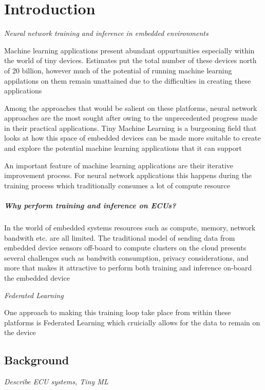 \part{Introduction}

\textit{Neural network training and inference in embedded environments}

{\color{blue}
Machine learning applications present abundant oppurtunities especially within the world of tiny devices. Estimates put the total number of these devices north of 20 billion, however much of the potential of running machine learning appilations on them remain unattained due to the difficulties in creating these applications
}

{\color{blue}
Among the approaches that would be salient on these platforms, neural network approaches are the most sought after owing to the unprecedented progress made in their practical applications. Tiny Machine Learning is a burgeoning field that looks at how this space of embedded devices can be made more suitable to create and explore the potential machine learning applications that it can support
}

{\color{blue}
An important feature of machine learning applications are their iterative improvement process. For neural network applications this happens during the training process which traditionally consumes a lot of compute resource
}

\subsubsection{Why perform training and inference on ECUs?}

{\color{blue}
In the world of embedded systems resources such as compute, memory, network bandwith etc. are all limited. The traditional model of sending data from embedded device sensors off-board to compute clusters on the cloud presents several challenges such as bandwith consumption, privacy considerations, and more that makes it attractive to perform both training and inference on-board the embedded device
}

\textit{Federated Learning}

{\color{blue}
One approach to making this training loop take place from within these platforms is Federated Learning which cruicially allows for the data to remain on the device
}

\chapter{Background}
\textit{Describe ECU systems, Tiny ML}

